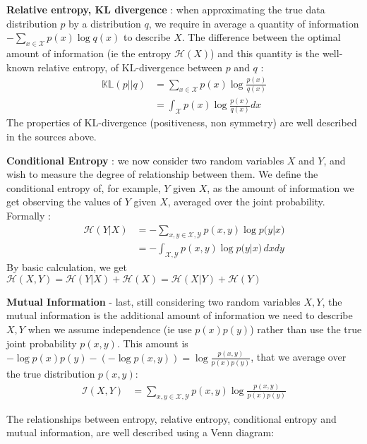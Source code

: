\textbf{Relative entropy, KL divergence} : when approximating the true data distribution $p$ by a distribution $q$, we require in average a quantity of information $-\sum_{x \in \mathcal{X}} p(x) \log{q(x)} $ to describe $X$. The difference between the optimal amount of information (ie the entropy $\mathcal{H}(X)$) and this quantity is the well-known relative entropy, of KL-divergence between $p$ and $q$ :
\begin{align}
    \mathbb{KL}(p \vert\vert q) &= \sum_{x \in \mathcal{X}} p(x) \log{\frac{p(x)}{q(x)}} \\
    &= \int_\mathcal{X} p(x) \log{\frac{p(x)}{q(x)}}dx
\end{align}
The properties of KL-divergence (positiveness, non symmetry) are well described in the sources above.

\textbf{Conditional Entropy} : we now consider two random variables $X$ and $Y$, and wish to measure the degree of relationship between them. We define the conditional entropy of, for example, $Y$ given $X$, as the amount of information we get observing the values of $Y$ given $X$, averaged over the joint probability. Formally :
\begin{align*}
    \mathcal{H}(Y \vert X) &= -\sum_{x,y \in \mathcal{X, Y}} p(x,y) \log{p(y \vert x}) \\
    &= - \int_{\mathcal{X,Y}} p(x,y) \log{p(y\vert x}) \, dxdy
\end{align*}
By basic calculation, we get $\mathcal{H}(X,Y) = \mathcal{H}(Y\vert X) + \mathcal{H}(X) =  \mathcal{H}(X\vert Y) + \mathcal{H}(Y)$

\textbf{Mutual Information} - last, still considering two random variables $X, Y$, the mutual information is the additional amount of information we need to describe $X,Y$ when we assume independence (ie use $p(x)p(y)$) rather than use the true joint probability $p(x,y)$. This amount is $- \log{p(x)p(y)} - (-\log{p(x,y)}) = \log{\frac{p(x,y)}{p(x)p(y)}} $, that we average over the true distribution $p(x,y)$:
\begin{align}
    \mathcal{I}(X,Y) &= \sum_{x,y \in \mathcal{X,Y}} p(x,y) \log{\frac{p(x,y)}{p(x)p(y)}}
\end{align}

The relationships between entropy, relative entropy, conditional entropy and mutual information, are well described using a Venn diagram:

